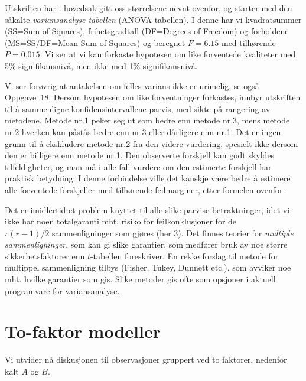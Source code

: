 \noindent Utskriften har i hovedsak gitt oss størrelsene nevnt ovenfor,
og starter med den såkalte {\em variansanalyse-tabellen} (ANOVA-tabellen).
I denne har vi kvadratsummer (SS=Sum of Squares), frihetsgradtall
(DF=Degrees of Freedom) og forholdene (MS=SS/DF=Mean Sum of Squares) og beregnet
 $F=6.15$ med tilhørende $P=0.015$. Vi ser at vi kan forkaste hypotesen
om like forventede kvaliteter med 5\% signifikansnivå, men ikke med
1\% signifikansnivå. 

Vi ser forøvrig at antakelsen om felles varians ikke er urimelig, 
se også Oppgave~18. Dersom hypotesen
om like forventninger forkastes, innbyr utskriften til å sammenligne
konfidensintervallene parvis, med sikte på rangering av metodene.
Metode nr.1 peker seg ut som bedre enn metode nr.3, mens metode nr.2 hverken
 kan påstås bedre enn nr.3 eller dårligere enn nr.1. Det er
ingen grunn til å ekskludere metode nr.2 fra den videre vurdering,
spesielt ikke dersom den er billigere enn metode nr.1. Den observerte forskjell
kan godt skyldes tilfeldigheter, og man må i alle fall vurdere om den
estimerte forskjell har praktisk betydning. I denne forbindelse ville det
kanskje være bedre å estimere alle forventede forskjeller
 med tilhørende feilmarginer, etter formelen ovenfor. 

Det er imidlertid et problem knyttet til alle slike parvise betraktninger,
idet vi ikke har noen totalgaranti mht. risiko for feilkonklusjoner for de\\
$r(r-1)/2$ sammenligninger som gjøres (her 3).
Det finnes teorier for {\em multiple sammenligninger},
som kan gi slike garantier, som medfører bruk av
noe større sikkerhetsfaktorer enn $t$-tabellen foreskriver.
En rekke forslag til metode for multippel sammenligning tilbys (Fisher, Tukey,
Dunnett etc.),
som avviker noe mht. hvilke garantier som gis. Slike metoder gis ofte
som opsjoner i aktuell programvare for variansanalyse.


\section{To-faktor modeller}

Vi utvider nå diskusjonen til observasjoner gruppert ved to faktorer,
nedenfor kalt $A$ og $B$.\\

